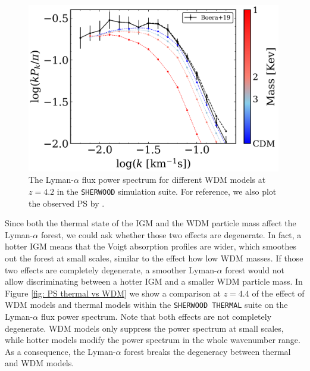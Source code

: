 \begin{figure}[ht]
        \centering
        \includegraphics[width=0.99\textwidth]{img/ML/PS_sherwood.png}
        \caption{The Lyman-$\alpha$ flux power spectrum for different WDM models at $z=4.2$ in the \texttt{SHERWOOD} simulation suite. For reference, we also plot the observed PS by \cite{Boera_2019}.}
        \label{fig: sherwood exact PS}     
\end{figure}


Since both the thermal state of the IGM and the WDM particle mass affect the Lyman-$\alpha$ forest, we could ask whether those two effects are degenerate. In fact, a hotter IGM means that the Voigt absorption profiles are wider, which smoothes out the forest at small scales, similar to the effect how low WDM masses. If those two effects are completely degenerate, a smoother Lyman-$\alpha$ forest would not allow discriminating between a hotter IGM and a smaller WDM particle mass. In Figure \ref{fig: PS thermal vs WDM} we show a comparison at $z=4.4$ of the effect of WDM models and thermal models within the \texttt{SHERWOOD THERMAL} suite on the Lyman-$\alpha$ flux power spectrum. Note that both effects are not completely degenerate. WDM models only suppress the power spectrum at small scales, while hotter models modify the power spectrum in the whole wavenumber range. As a consequence, the Lyman-$\alpha$ forest breaks the degeneracy between thermal and WDM models.

